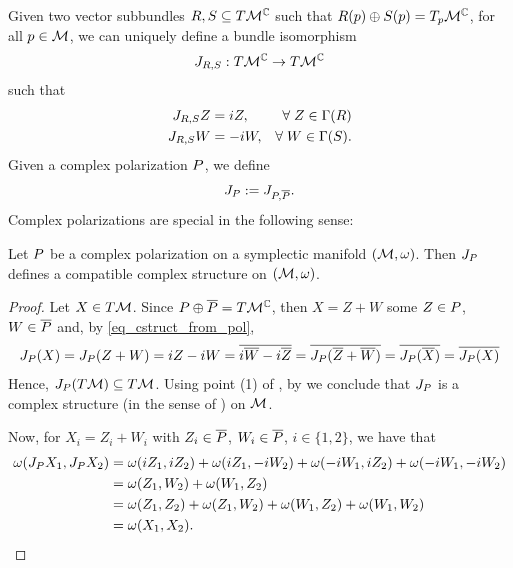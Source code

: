 \documentclass[notas.tex]{subfiles}
\begin{document}
Given two vector subbundles $R, S \subseteq T\mathcal{M}^{\mathbb{C}}$ such that $R(p) \oplus S(p) = T_p\mathcal{M}^{\mathbb{C}}$, for all $p \in \mathcal{M}$, we can uniquely define a bundle isomorphism 
\begin{align} \label{eq_acs_from_subbundle}
	J_{R,S}: T\mathcal{M}^{\mathbb{C}} \to T\mathcal{M}^{\mathbb{C}}
\end{align}
such that
\begin{align}\label{eq_cstruct_from_pol}
	J_{R,S} Z &= i Z, &\forall Z \in \sect(R) \\
	J_{R,S} W &= - i W,  &\forall W \in \sect(S) .\nonumber
\end{align}
Given a complex polarization $P$, we define 
\begin{align} \label{eq_cpol_acs}
	J_P := J_{P, \overline{P}}.
\end{align}
Complex polarizations are special in the following sense: 
\begin{prop} \label{prop_cstruct_from_pol}
	Let $P$ be a complex polarization on a symplectic manifold $(\mathcal{M}, \omega)$. Then 
	$J_P$ defines a compatible complex structure on $(\mathcal{M}, \omega)$.
\end{prop}
\begin{proof}
	Let $X \in T \mathcal{M}$. Since $P \oplus \overline {P} = T \mathcal{M}^{\mathbb{C}}$, then $X = Z + W$ some $Z \in P$, $W \in \overline {P}$ and, by \eqref{eq_cstruct_from_pol},
	\begin{align*}
		J_P(X) = J_P(Z + W) = iZ - iW = \overline{i \overline W - i \overline Z} = \overline{J_P(\overline Z+ \overline W)} = \overline{J_P(\overline{X})} = \overline{J_P(X)}
	\end{align*}
	Hence, $J_P(T\mathcal{M}) \subseteq T\mathcal{M}$. Using point (1) of , by  we conclude that $J_P$ is a complex structure (in the sense of ) on $\mathcal{M}$. 

	Now, for $X_i = Z_i + W_i$ with $Z_i \in \overline {P}$, $W_i \in \overline {P}$, $i \in \{1,2\}$, we have that
	\begin{align*}
		\omega(J_P X_1, J_P X_2) &= \omega(i Z_1, i Z_2) + \omega(i Z_1, - i W_2) + \omega(-i W_1, i Z_2) + \omega(-i W_1, -i W_2) \\
		&= \omega(Z_1, W_2) + \omega(W_1, Z_2) \\
		&= \omega(Z_1, Z_2) + \omega(Z_1, W_2) + \omega(W_1, Z_2) + \omega(W_1, W_2) \\
		&= \omega(X_1, X_2).
	\end{align*}
\end{proof}
\end{document}
